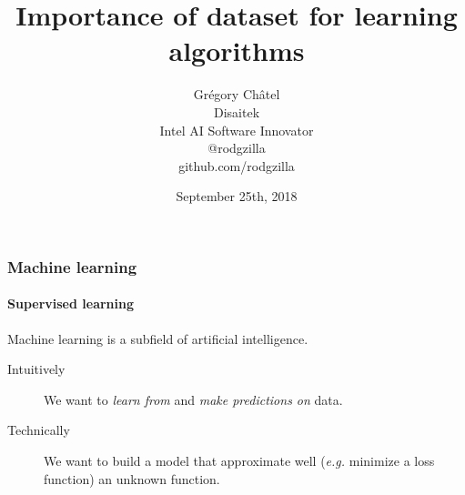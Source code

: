 \documentclass[9pt]{beamer}
\title{Importance of dataset for learning algorithms}
\author[G. Châtel]{Grégory Châtel\\\vspace{0.3cm}Disaitek\\Intel AI Software Innovator\\\vspace{0.3cm}@rodgzilla\\github.com/rodgzilla}
\date{September 25th, 2018}
\begin{document}
\begin{frame}

  \maketitle

\end{frame}

\begin{frame}

  \frametitle{Machine learning}

  \framesubtitle{Supervised learning}

  Machine learning is a subfield of artificial intelligence.

  \bigskip

  \begin{description}
    \item[Intuitively] We want to \emph{learn from} and \emph{make predictions
    on} data.

    \medskip

    \item[Technically] We want to build a model that approximate well
      (\textit{e.g.} minimize a loss function) an unknown function.
  \end{description}
\end{frame}






\end{document}
